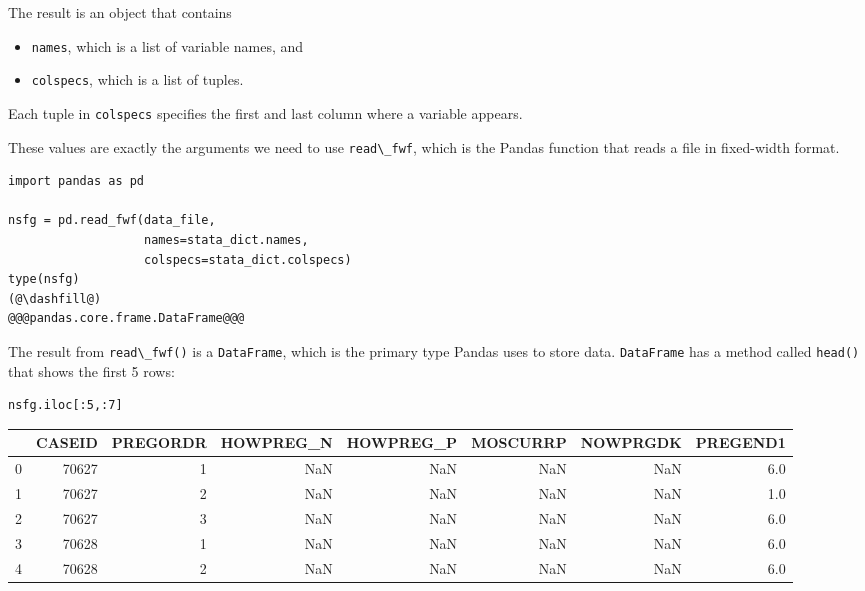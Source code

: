 The result is an object that contains

\begin{itemize}
\item
  \passthrough{\lstinline!names!}, which is a list of variable names,
  and
\item
  \passthrough{\lstinline!colspecs!}, which is a list of tuples.
\end{itemize}

Each tuple in \passthrough{\lstinline!colspecs!} specifies the first and
last column where a variable appears.

These values are exactly the arguments we need to use
\passthrough{\lstinline!read\_fwf!}, which is the Pandas function that
reads a file in fixed-width format.

\begin{lstlisting}[]
import pandas as pd

nsfg = pd.read_fwf(data_file, 
                   names=stata_dict.names, 
                   colspecs=stata_dict.colspecs)
type(nsfg)
(@\dashfill@)
@@@pandas.core.frame.DataFrame@@@
\end{lstlisting}

The result from \passthrough{\lstinline!read\_fwf()!} is a
\passthrough{\lstinline!DataFrame!}, which is the primary type Pandas
uses to store data. \passthrough{\lstinline!DataFrame!} has a method
called \passthrough{\lstinline!head()!} that shows the first 5 rows:

\begin{lstlisting}[]
nsfg.iloc[:5,:7]
\end{lstlisting}

\begin{tabular}{lrrrrrrr}
\midrule
{} &  CASEID &  PREGORDR &  HOWPREG\_N &  HOWPREG\_P &  MOSCURRP &  NOWPRGDK &  PREGEND1 \\
\midrule
0 &   70627 &         1 &        NaN &        NaN &       NaN &       NaN &       6.0 \\
1 &   70627 &         2 &        NaN &        NaN &       NaN &       NaN &       1.0 \\
2 &   70627 &         3 &        NaN &        NaN &       NaN &       NaN &       6.0 \\
3 &   70628 &         1 &        NaN &        NaN &       NaN &       NaN &       6.0 \\
4 &   70628 &         2 &        NaN &        NaN &       NaN &       NaN &       6.0 \\
\midrule
\end{tabular}

